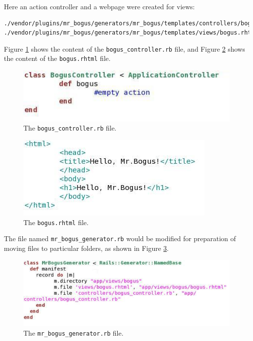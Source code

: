\documentclass{article}
\begin{document}
Here an action controller and a webpage were created for views:

\begin{verbatim}
./vendor/plugins/mr_bogus/generators/mr_bogus/templates/controllers/bogus_controller.rb
./vendor/plugins/mr_bogus/generators/mr_bogus/templates/views/bogus.rhtml
\end{verbatim}

Figure \ref{fig:instruction-3} shows the content of the \texttt{bogus\_controller.rb} file, and Figure \ref{fig:instruction-4} shows the content of the \texttt{bogus.rhtml} file.

\begin{figure}
    \centering    
    \includegraphics[scale=0.5]{fig/instruction-3.jpg}
    \caption{The \texttt{bogus\_controller.rb} file.}
    \label{fig:instruction-3}
\end{figure}

\begin{figure}
    \centering
    \includegraphics[scale=0.5]{fig/instruction-4.jpg}
    \caption{The \texttt{bogus.rhtml} file.}
    \label{fig:instruction-4}
\end{figure}

The file named \texttt{mr\_bogus\_generator.rb} would be modified for preparation of moving files to particular folders, as shown in Figure \ref{fig:instruction-5}.

\begin{figure}
    \centering    
    \includegraphics[scale=0.5]{fig/instruction-5.jpg}
    \caption{The \texttt{mr\_bogus\_generator.rb} file.}
    \label{fig:instruction-5}
\end{figure}
\end{document}
